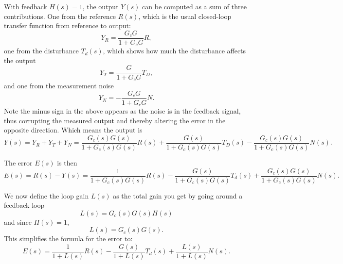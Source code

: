 With feedback $H(s) = 1$, the output $Y(s)$ can be computed as a sum of three contributions.
One from the reference $R(s)$, which is the usual closed-loop transfer function from reference to output:
\begin{equation*}
  Y_R = \frac{G_c G}{1 + G_c G}R
,\end{equation*}
one from the disturbance $T_d(s)$, which shows how much the disturbance affects the output
\begin{equation*}
  Y_T = \frac{G}{1 + G_c G} T_D
,\end{equation*}
and one from the measurement noise
\begin{equation*}
  Y_N = - \frac{G_c G}{1 + G_c G}N
.\end{equation*}
Note the minus sign in the above appears as the noise is in the feedback signal, thus corrupting the measured output and thereby altering the error in the opposite direction.
Which means the output is
\begin{equation*}
  Y(s) = Y_R + Y_T + Y_N = \frac{G_c(s) G(s)}{1 + G_c(s) G(s)}R(s) + \frac{G(s)}{1 + G_c(s) G(s)} T_D(s) - \frac{G_c(s) G(s)}{1 + G_c(s) G(s)}N(s)
.\end{equation*}

The error $E(s)$ is then
\begin{equation*}
  E(s) = R(s) - Y(s) = \frac{1}{1 + G_c(s) G(s)}R(s) - \frac{G(s)}{1 + G_c(s) G(s)}T_d(s) + \frac{G_c (s) G(s)}{1 + G_c(s) G(s)} N(s)
.\end{equation*}

We now define the loop gain $L(s)$ as the total gain you get by going around a feedback loop
\begin{equation*}
  L(s) = G_c(s) G(s) H(s) 
\end{equation*}
and since $H(s) = 1$, 
\begin{equation*}
  L(s) = G_c(s) G(s)
.\end{equation*}
This simplifies the formula for the error to:
\begin{equation*}
  E(s) = \frac{1}{1 + L(s)}R(s) - \frac{G(s)}{1 + L(s)} T_d(s) + \frac{L(s)}{1 + L(s)} N(s)
.\end{equation*}

